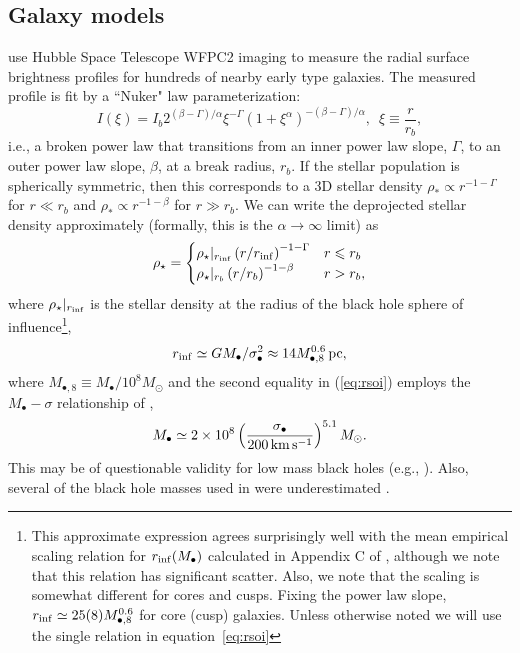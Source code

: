 \documentclass[usenatbib,fleqn]{mn2e}
\newcommand{\rb}{r_b}
\newcommand{\rhostar}{\rho_*}
\newcommand{\Mbh}[1][]{M_{\bullet#1}}
\newcommand{\Mbheight}{M_{\bullet,8}}
\newcommand{\rinf}{r_{\rm inf}}
\begin{document}
\subsection{Galaxy models}
\label{sec:gal_model}
\citet{LauerFaber+:2007a} use Hubble Space Telescope WFPC2 imaging to
measure the radial surface brightness profiles for hundreds of nearby
early type galaxies. The measured profile is fit by a ``Nuker" law parameterization:
\begin{equation}
  I(\xi)=I_b 2^{(\beta-\Gamma)/\alpha} \xi^{-\Gamma} (1+\xi^\alpha)^{-(\beta-\Gamma)/\alpha}, \,\,\,\xi\equiv\frac{r}{r_b},
\end{equation}
i.e., a broken power law that transitions from an inner power law
slope, $\Gamma$, to an outer power law slope, $\beta$, at a break
radius, $\rb$.  If the stellar population is spherically symmetric,
then this corresponds to a 3D stellar density $\rhostar \propto
r^{-1-\Gamma}$ for $r \ll \rb$ and $\rhostar\propto r^{-1-\beta}$ for
$r \gg \rb$.  We can write the deprojected stellar density
approximately (formally, this is the $\alpha \rightarrow \infty$
limit) as
\begin{align}
\rho_\star = 
\begin{cases}
\rho_\star|_{\rinf} \left(r/\rinf\right)^{-1-\Gamma} & r \leq r_b\\
\rho_\star|_{r_b} \left(r/r_b\right)^{-1-\beta} & r > r_b,
\label{eq:rhostar}
\end{cases}
\end{align}
where $\rho_\star|_{\rinf}$ is the stellar density at the radius of
the black hole sphere of influence\footnote{This approximate
  expression agrees surprisingly well with the mean empirical scaling
  relation for $r_{\rm inf}(M_\bullet)$ calculated in Appendix C of
  \citet{Stone&Metzger15}, although we note that this relation has
  significant scatter. Also, we note that the  scaling is somewhat
  different for cores and cusps. Fixing the power law slope,
  $\rinf\simeq 25 (8) \Mbheight^{0.6}$ for core (cusp)
  galaxies. Unless otherwise noted we will use the single relation in
  equation~\eqref{eq:rsoi}},
\begin{equation}
  \rinf \simeq G \Mbh/\sigma_{\bullet}^2 \approx 14 M_{\bullet,8}^{0.6}\,{\rm pc},
\label{eq:rsoi}
\end{equation}
where $M_{\bullet,8} \equiv M_{\bullet}/10^{8}M_{\odot}$ and the
second equality in (\ref{eq:rsoi}) employs the $\Mbh-\sigma$
relationship of \citet{McConnellMa+:2011a},
 \begin{align}
M_{\bullet} \simeq 2\times 10^{8}\left(\frac{\sigma_{\bullet}}{200\,{\rm
      km\,s^{-1}}}\right)^{5.1}M_{\odot}.
\label{eq:Msigma}
\end{align}
This may be of questionable validity for low mass black holes (e.g.,
\citealt{Greene+2010, Kormendy+2013}). Also, several of the black hole
masses used in \citealt{McConnellMa+:2011a} were underestimated
\citep{Kormendy+2013}. 
\end{document}
